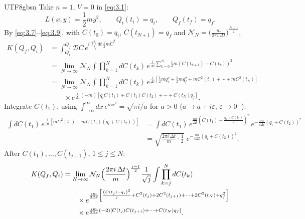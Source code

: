 \documentclass[11pt,a4paper,oneside]{report}
\begin{document}
\begin{CJK*}{UTF8}{gbsn}
Take $n=1$, $V=0$ in \eqref{eq:3.1}:
\begin{equation*}
L(x,y)=\frac12my^2,\qquad Q_i(t_i)=q_i,\qquad Q_f(t_f)=q_f.
\tag{3.13}\label{eq:3.13}
\end{equation*}
By \eqref{eq:3.7}–\eqref{eq:3.9}, with $C(t_0)=q_i$, $C(t_{N+1})=q_f$ and $\mathcal N_N=\bigl(\frac{m}{2\pi i\,\Delta t}\bigr)^{\frac{N+1}{2}}$,
\begin{equation*}
\begin{aligned}
K(Q_f,Q_i)&=\int_{Q_i}^{Q_f}\mathcal DC\,e^{i\int_{t_i}^{t_f}dt\,\frac12m\dot C^2}\\
&=\lim_{N\to\infty}\mathcal N_N\int\prod_{k=1}^{N}dC(t_k)\,e^{\frac{i}{\Delta t}\sum_{k=0}^{N}\frac12m\left(C(t_{k+1})-C(t_k)\right)^2}\\
&=\lim_{N\to\infty}\mathcal N_N\int\prod_{k=1}^{N}dC(t_k)\,
e^{\frac{i}{\Delta t}\left[\frac12mq_i^2+\frac12mq_f^2+mC^2(t_1)+\cdots+mC^2(t_N)\right]}\\
&\qquad{}\times e^{\frac{i}{\Delta t}(-m)\left[q_iC(t_1)+C(t_1)C(t_2)+\cdots+C(t_N)q_f\right]}.
\end{aligned}
\tag{3.14}\label{eq:3.14}
\end{equation*}
Integrate $C(t_1)$, using $\int_{-\infty}^{\infty}dx\,e^{iax^2}=\sqrt{\pi i/a}$ for $a>0$ ($a\to a+i\varepsilon$, $\varepsilon\to0^+$):
\begin{equation*}
\begin{aligned}
\int dC(t_1)\,e^{\frac{i}{\Delta t}\left[mC^2(t_1)-mC(t_1)\left(q_i+C(t_2)\right)\right]}
&=\int dC(t_1)\,e^{\frac{im}{\Delta t}\left(C(t_1)-\frac{q_i+C(t_2)}{2}\right)^2}\,e^{-\frac{im}{4\Delta t}\left(q_i+C(t_2)\right)^2}\\
&=\sqrt{\frac{2\pi i\,\Delta t}{m}\cdot\frac12}\;e^{-\frac{im}{4\Delta t}\left(q_i+C(t_2)\right)^2}.
\end{aligned}
\tag{3.15}\label{eq:3.15}
\end{equation*}
After $C(t_1),\ldots,C(t_{j-1})$, $1\le j\le N$:
\begin{equation*}
\begin{aligned}
K(Q_f,Q_i)&=\lim_{N\to\infty}\mathcal N_N\Bigl(\frac{2\pi i\,\Delta t}{m}\Bigr)^{\frac{j-1}{2}}\frac{1}{\sqrt j}
\int\prod_{k=j}^{N}dC(t_k)\\
&\qquad{}\times 
e^{\frac{im}{2\Delta t}\left[\frac{\left(C(t_j)-q_i\right)^2}{j}+C^2(t_j)+2C^2(t_{j+1})+\cdots+2C^2(t_N)+q_f^2\right]}\\
&\qquad{}\times e^{\frac{im}{2\Delta t}(-2)\left[C(t_j)C(t_{j+1})+\cdots+C(t_N)q_f\right]}.
\end{aligned}

\end{equation*}
\end{CJK*}
\end{document}
